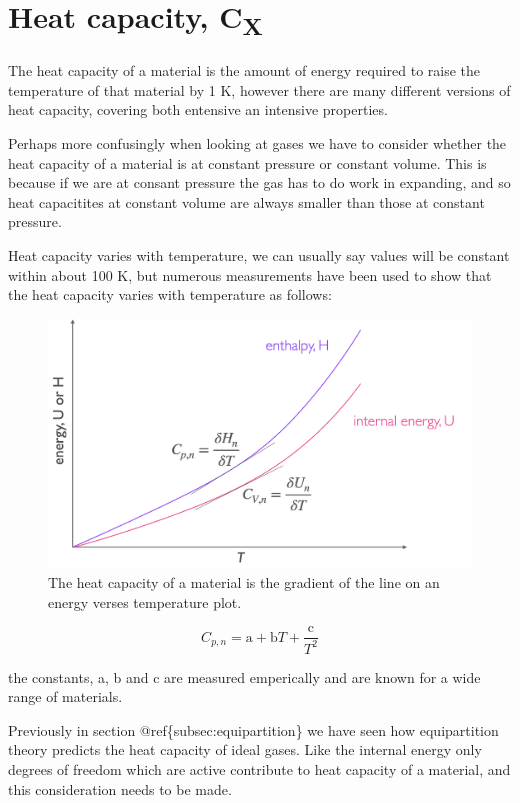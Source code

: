 \documentclass[
]{book}
\begin{document}
\hypertarget{heat-capacity-cx}{%
\section{\texorpdfstring{Heat capacity, C\textsubscript{X}}{Heat capacity, CX}}\label{heat-capacity-cx}}

The heat capacity of a material is the amount of energy required to raise the temperature of that material by 1 K, however there are many different versions of heat capacity, covering both entensive an intensive properties.

Perhaps more confusingly when looking at gases we have to consider whether the heat capacity of a material is at constant pressure or constant volume. This is because if we are at consant pressure the gas has to do work in expanding, and so heat capacitites at constant volume are always smaller than those at constant pressure.

Heat capacity varies with temperature, we can usually say values will be constant within about 100 K, but numerous measurements have been used to show that the heat capacity varies with temperature as follows:

\begin{figure}

{\centering \includegraphics[width=0.3\linewidth]{images/heatcapacitypV} 

}

\caption{The heat capacity of a material is the gradient of the line on an energy verses temperature plot.}\label{fig:heatcapacitypV}
\end{figure}

\begin{equation}
C_{p,n}=\textrm{a}+\textrm{b}T+\frac{\textrm{c}}{T^2}
\label{eq:heatcapacitytemp}
\end{equation}

the constants, a, b and c are measured emperically and are known for a wide range of materials.

Previously in section @ref\{subsec:equipartition\} we have seen how equipartition theory predicts the heat capacity of ideal gases. Like the internal energy only degrees of freedom which are active contribute to heat capacity of a material, and this consideration needs to be made.
\end{document}
